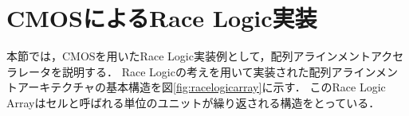 \section{CMOSによるRace Logic実装}
本節では，CMOSを用いたRace Logic実装例として，配列アラインメントアクセラレータを説明する．
Race Logicの考えを用いて実装された配列アラインメントアーキテクチャの基本構造を図\ref{fig:racelogicarray}に示す．
このRace Logic Arrayはセルと呼ばれる単位のユニットが繰り返される構造をとっている．
\begin{figure}[t!]
 	\begin{center}

\end{center}
\end{figure}
